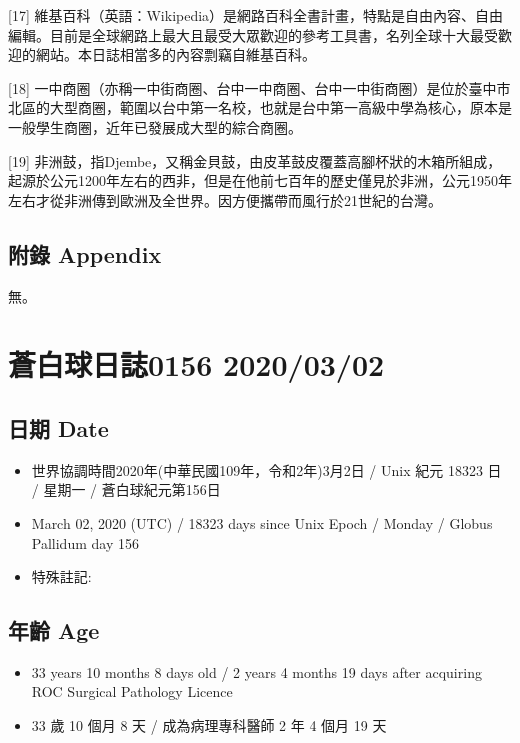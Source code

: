 \documentclass[a5paper, 12pt
]{book}
\providecommand{\tightlist}{%
  \setlength{\itemsep}{0pt}\setlength{\parskip}{0pt}}
\begin{document}
{[}17{]}
維基百科（英語：Wikipedia）是網路百科全書計畫，特點是自由內容、自由編輯。目前是全球網路上最大且最受大眾歡迎的參考工具書，名列全球十大最受歡迎的網站。本日誌相當多的內容剽竊自維基百科。

{[}18{]}
一中商圈（亦稱一中街商圈、台中一中商圈、台中一中街商圈）是位於臺中市北區的大型商圈，範圍以台中第一名校，也就是台中第一高級中學為核心，原本是一般學生商圈，近年已發展成大型的綜合商圈。

{[}19{]}
非洲鼓，指Djembe，又稱金貝鼓，由皮革鼓皮覆蓋高腳杯狀的木箱所組成，起源於公元1200年左右的西非，但是在他前七百年的歷史僅見於非洲，公元1950年左右才從非洲傳到歐洲及全世界。因方便攜帶而風行於21世紀的台灣。

\hypertarget{ux9644ux9304-appendix}{%
\subsection{附錄 Appendix}\label{ux9644ux9304-appendix}}

無。

\hypertarget{ux84bcux767dux7403ux65e5ux8a8c0156-20200302}{%
\section{蒼白球日誌0156
2020/03/02}\label{ux84bcux767dux7403ux65e5ux8a8c0156-20200302}}

\hypertarget{ux65e5ux671f-date-1}{%
\subsection{日期 Date}\label{ux65e5ux671f-date-1}}

\begin{itemize}
\tightlist
\item
  世界協調時間2020年(中華民國109年，令和2年)3月2日 / Unix 紀元 18323 日
  / 星期一 / 蒼白球紀元第156日
\item
  March 02, 2020 (UTC) / 18323 days since Unix Epoch / Monday / Globus
  Pallidum day 156
\item
  特殊註記:
\end{itemize}

\hypertarget{ux5e74ux9f61-age-1}{%
\subsection{年齡 Age}\label{ux5e74ux9f61-age-1}}

\begin{itemize}
\tightlist
\item
  33 years 10 months 8 days old / 2 years 4 months 19 days after
  acquiring ROC Surgical Pathology Licence
\item
  33 歲 10 個月 8 天 / 成為病理專科醫師 2 年 4 個月 19 天
\end{itemize}
\end{document}
